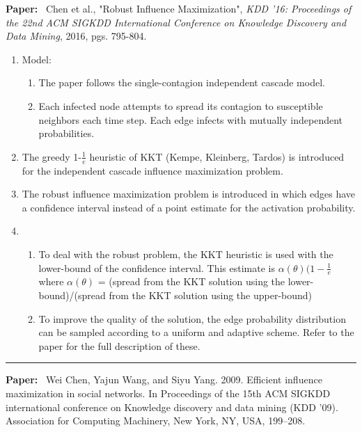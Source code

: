 \documentclass[11pt]{article}
\begin{document}
\textbf{Paper:}~
Chen et al., "Robust Influence Maximization", \emph{KDD '16: Proceedings of the 22nd ACM SIGKDD International Conference on Knowledge Discovery and Data Mining}, 2016, pgs. 795-804.
\begin{enumerate}
    \item Model: \begin{enumerate}
        \item The paper follows the single-contagion independent cascade model.
        \item Each infected node attempts to spread its contagion to susceptible neighbors each time step. Each edge infects with mutually independent probabilities.
    \end{enumerate}
    \item The greedy 1-$\frac{1}{e}$ heuristic of KKT (Kempe, Kleinberg, Tardos) is introduced for the independent cascade influence maximization problem. 
    \item The robust influence maximization problem is introduced in which edges have a confidence interval instead of a point estimate for the activation probability.
    \item \begin{enumerate}
        \item To deal with the robust problem, the KKT heuristic is used with the lower-bound of the confidence interval. This estimate is $\alpha(\theta)(1-\frac{1}{e}$ where $\alpha(\theta)$ = (spread from the KKT solution using the lower-bound)/(spread from the KKT solution using the upper-bound)
        \item To improve the quality of the solution, the edge probability distribution can be sampled according to a uniform and adaptive scheme. Refer to the paper for the full description of these.
    \end{enumerate}
    
\end{enumerate}
\noindent
\rule{\textwidth}{0.01in}
\textbf{Paper:}~ Wei Chen, Yajun Wang, and Siyu Yang. 2009. Efficient influence maximization in social networks. In Proceedings of the 15th ACM SIGKDD international conference on Knowledge discovery and data mining (KDD ’09). Association for Computing Machinery, New York, NY, USA, 199–208.
\end{document}
